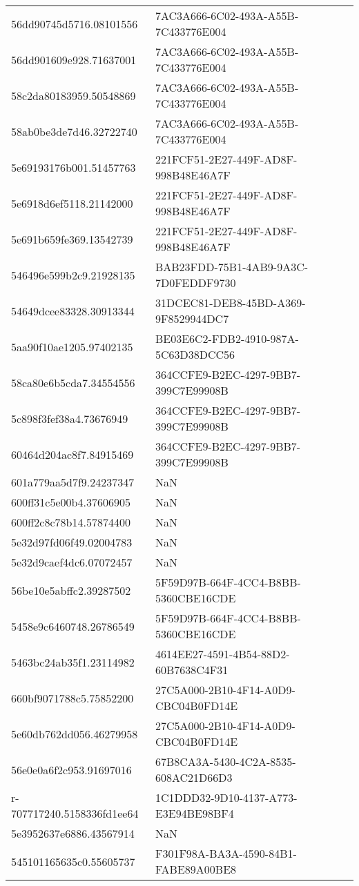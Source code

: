 \begin{tabular}{ll}
56dd90745d5716.08101556 & 7AC3A666-6C02-493A-A55B-7C433776E004 \\
56dd901609e928.71637001 & 7AC3A666-6C02-493A-A55B-7C433776E004 \\
58c2da80183959.50548869 & 7AC3A666-6C02-493A-A55B-7C433776E004 \\
58ab0be3de7d46.32722740 & 7AC3A666-6C02-493A-A55B-7C433776E004 \\
5e69193176b001.51457763 & 221FCF51-2E27-449F-AD8F-998B48E46A7F \\
5e6918d6ef5118.21142000 & 221FCF51-2E27-449F-AD8F-998B48E46A7F \\
5e691b659fe369.13542739 & 221FCF51-2E27-449F-AD8F-998B48E46A7F \\
546496e599b2c9.21928135 & BAB23FDD-75B1-4AB9-9A3C-7D0FEDDF9730 \\
54649dcee83328.30913344 & 31DCEC81-DEB8-45BD-A369-9F8529944DC7 \\
5aa90f10ae1205.97402135 & BE03E6C2-FDB2-4910-987A-5C63D38DCC56 \\
58ca80e6b5cda7.34554556 & 364CCFE9-B2EC-4297-9BB7-399C7E99908B \\
5c898f3fef38a4.73676949 & 364CCFE9-B2EC-4297-9BB7-399C7E99908B \\
60464d204ac8f7.84915469 & 364CCFE9-B2EC-4297-9BB7-399C7E99908B \\
601a779aa5d7f9.24237347 & NaN \\
600ff31c5e00b4.37606905 & NaN \\
600ff2c8c78b14.57874400 & NaN \\
5e32d97fd06f49.02004783 & NaN \\
5e32d9caef4dc6.07072457 & NaN \\
56be10e5abffc2.39287502 & 5F59D97B-664F-4CC4-B8BB-5360CBE16CDE \\
5458e9c6460748.26786549 & 5F59D97B-664F-4CC4-B8BB-5360CBE16CDE \\
5463bc24ab35f1.23114982 & 4614EE27-4591-4B54-88D2-60B7638C4F31 \\
660bf9071788c5.75852200 & 27C5A000-2B10-4F14-A0D9-CBC04B0FD14E \\
5e60db762dd056.46279958 & 27C5A000-2B10-4F14-A0D9-CBC04B0FD14E \\
56e0e0a6f2c953.91697016 & 67B8CA3A-5430-4C2A-8535-608AC21D66D3 \\
r-707717240.5158336fd1ee64 & 1C1DDD32-9D10-4137-A773-E3E94BE98BF4 \\
5e3952637e6886.43567914 & NaN \\
545101165635c0.55605737 & F301F98A-BA3A-4590-84B1-FABE89A00BE8 \\

\end{tabular}
